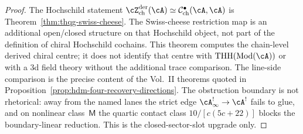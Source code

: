 \begin{proof}
The Hochschild statement
$\cZ^{\mathrm{der}}_{\mathrm{ch}}(\cA)
\simeq\mathcal{C}^{\bullet}_{\mathrm{ch}}(\cA,\cA)$ is
Theorem~\ref{thm:thqg-swiss-cheese}. The Swiss-cheese restriction
map is an additional open/closed structure on that Hochschild object,
not part of the definition of chiral Hochschild cochains. This theorem
computes the chain-level derived chiral centre; it does not identify
that centre with $\mathrm{THH}(\mathrm{Mod}(\cA))$ or with a $3$d
field theory without the additional trace comparison. The line-side
comparison is the precise content of the Vol.~II theorems quoted in
Proposition~\ref{prop:hdm-four-recovery-directions}. The obstruction
boundary is not rhetorical: away from the named lanes the strict edge
$\cA^{!}_\infty\to\cA^!$ fails to glue, and on nonlinear
class~$\mathsf{M}$ the quartic contact class
$10/[c(5c+22)]$ blocks the boundary-linear reduction. This is the
closed-sector-slot upgrade only.
\end{proof}

